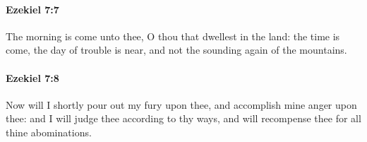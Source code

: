 		\paragraph{Ezekiel 7:7} %
			\label{EZEKIEL-7-7}

			The morning is come unto thee, O thou that dwellest in the land: the time is come, the day of trouble is near, and not the sounding again of the mountains.


		\paragraph{Ezekiel 7:8} %
			\label{EZEKIEL-7-8}

			Now will I shortly pour out my fury upon thee, and accomplish mine anger upon thee: and I will judge thee according to thy ways, and will recompense thee for all thine abominations.


